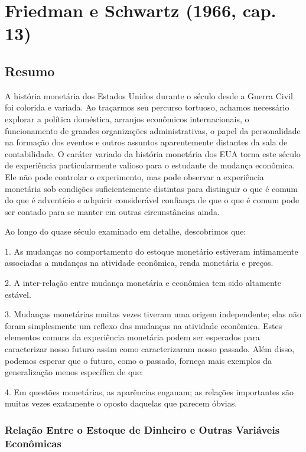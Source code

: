 \documentclass[12pt]{article}
\begin{document}
\section{\textbf{Friedman e Schwartz (1966, cap. 13)}}
\subsection{\textbf{Resumo}}

A história monetária dos Estados Unidos durante o século desde a Guerra Civil foi colorida e variada. Ao traçarmos seu percurso tortuoso, achamos necessário explorar a política doméstica, arranjos econômicos internacionais, o funcionamento de grandes organizações administrativas, o papel da personalidade na formação dos eventos e outros assuntos aparentemente distantes da sala de contabilidade. O caráter variado da história monetária dos EUA torna este século de experiência particularmente valioso para o estudante de mudança econômica. Ele não pode controlar o experimento, mas pode observar a experiência monetária sob condições suficientemente distintas para distinguir o que é comum do que é adventício e adquirir considerável confiança de que o que é comum pode ser contado para se manter em outras circunstâncias ainda.

Ao longo do quase século examinado em detalhe, descobrimos que:

1. As mudanças no comportamento do estoque monetário estiveram intimamente associadas a mudanças na atividade econômica, renda monetária e preços.

2. A inter-relação entre mudança monetária e econômica tem sido altamente estável.

3. Mudanças monetárias muitas vezes tiveram uma origem independente; elas não foram simplesmente um reflexo das mudanças na atividade econômica.
Estes elementos comuns da experiência monetária podem ser esperados para caracterizar nosso futuro assim como caracterizaram nosso passado. Além disso, podemos esperar que o futuro, como o passado, forneça mais exemplos da generalização menos específica de que:

4. Em questões monetárias, as aparências enganam; as relações importantes são muitas vezes exatamente o oposto daquelas que parecem óbvias.

\subsubsection{\textbf{Relação Entre o Estoque de Dinheiro e Outras Variáveis Econômicas}}
\end{document}
